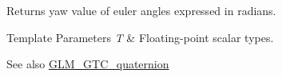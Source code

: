 Returns yaw value of euler angles expressed in radians.


\begin{DoxyTemplParams}{Template Parameters}
{\em T} & Floating-\/point scalar types.\\
\hline
\end{DoxyTemplParams}
\begin{DoxySeeAlso}{See also}
\mbox{\hyperlink{group__gtc__quaternion}{G\+L\+M\+\_\+\+G\+T\+C\+\_\+quaternion}} 
\end{DoxySeeAlso}
